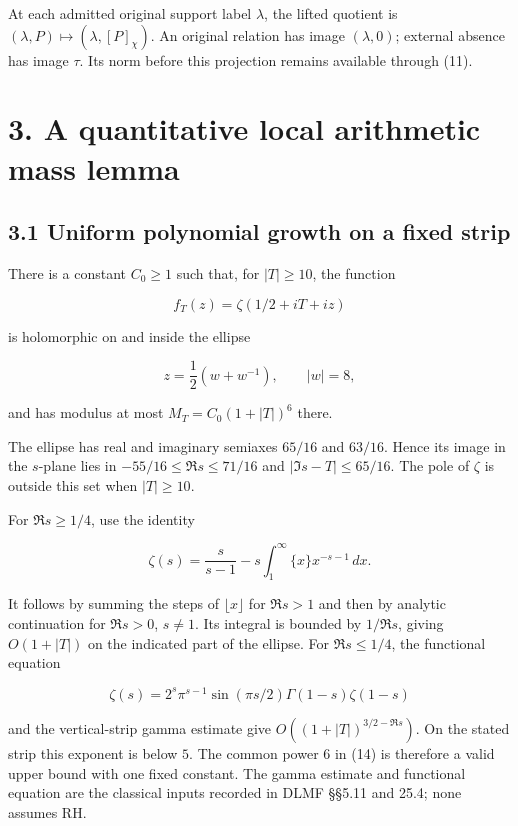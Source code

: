 \documentclass[
  11pt,
]{article}
\begin{document}
At each admitted original support label \(\lambda\), the lifted quotient
is \((\lambda,P)\mapsto(\lambda,[P]_\chi)\). An original relation has
image \((\lambda,0)\); external absence has image \(\tau\). Its norm
before this projection remains available through (11).

\section{3. A quantitative local arithmetic mass
lemma}\label{a-quantitative-local-arithmetic-mass-lemma}

\subsection{3.1 Uniform polynomial growth on a fixed
strip}\label{uniform-polynomial-growth-on-a-fixed-strip}

There is a constant \(C_0\ge1\) such that, for \(|T|\ge10\), the
function

\[
 f_T(z)=\zeta(1/2+iT+iz)                                                \tag{14}
\]

is holomorphic on and inside the ellipse

\[
 z=\frac12(w+w^{-1}),\qquad |w|=8,
                                                                         \tag{15}
\]

and has modulus at most \(M_T=C_0(1+|T|)^6\) there.

The ellipse has real and imaginary semiaxes \(65/16\) and \(63/16\).
Hence its image in the \(s\)-plane lies in \(-55/16\le\Re s\le71/16\)
and \(|\Im s-T|\le65/16\). The pole of \(\zeta\) is outside this set
when \(|T|\ge10\).

For \(\Re s\ge1/4\), use the identity

\[
 \zeta(s)=\frac{s}{s-1}-s\int_1^\infty\{x\}x^{-s-1}\,dx.              \tag{16}
\]

It follows by summing the steps of \(\lfloor x\rfloor\) for \(\Re s>1\)
and then by analytic continuation for \(\Re s>0\), \(s\ne1\). Its
integral is bounded by \(1/\Re s\), giving \(O(1+|T|)\) on the indicated
part of the ellipse. For \(\Re s\le1/4\), the functional equation

\[
 \zeta(s)=2^s\pi^{s-1}\sin(\pi s/2)\Gamma(1-s)\zeta(1-s)              \tag{17}
\]

and the vertical-strip gamma estimate give \(O((1+|T|)^{3/2-\Re s})\).
On the stated strip this exponent is below \(5\). The common power \(6\)
in (14) is therefore a valid upper bound with one fixed constant. The
gamma estimate and functional equation are the classical inputs recorded
in DLMF §§5.11 and 25.4; none assumes RH.
\end{document}
